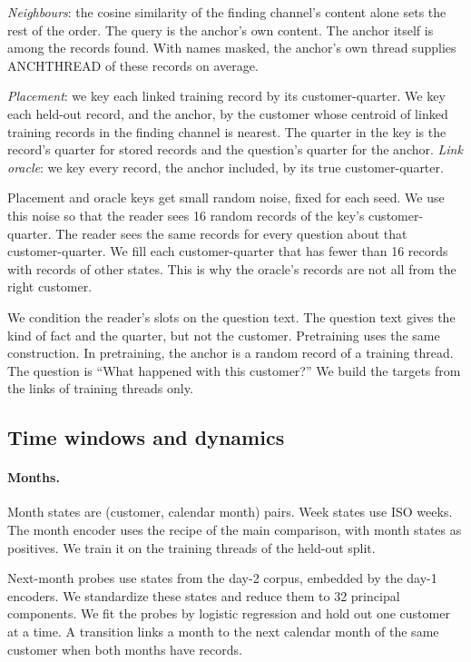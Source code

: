 \documentclass[11pt]{article}
\begin{document}
\emph{Neighbours}: the cosine similarity of the finding channel's content alone sets the rest of the order. The query is the anchor's own content. The anchor itself is among the records found. With names masked, the anchor's own thread supplies ANCHTHREAD of these records on average.

\emph{Placement}: we key each linked training record by its customer-quarter. We key each held-out record, and the anchor, by the customer whose centroid of linked training records in the finding channel is nearest. The quarter in the key is the record's quarter for stored records and the question's quarter for the anchor. \emph{Link oracle}: we key every record, the anchor included, by its true customer-quarter.

Placement and oracle keys get small random noise, fixed for each seed. We use this noise so that the reader sees 16 random records of the key's customer-quarter. The reader sees the same records for every question about that customer-quarter. We fill each customer-quarter that has fewer than 16 records with records of other states. This is why the oracle's records are not all from the right customer.

We condition the reader's slots on the question text. The question text gives the kind of fact and the quarter, but not the customer. Pretraining uses the same construction. In pretraining, the anchor is a random record of a training thread. The question is ``What happened with this customer?'' We build the targets from the links of training threads only.

\subsection{Time windows and dynamics}
\paragraph{Months.} Month states are (customer, calendar month) pairs. Week states use ISO weeks. The month encoder uses the recipe of the main comparison, with month states as positives. We train it on the training threads of the held-out split.

Next-month probes use states from the day-2 corpus, embedded by the day-1 encoders. We standardize these states and reduce them to 32 principal components. We fit the probes by logistic regression and hold out one customer at a time. A transition links a month to the next calendar month of the same customer when both months have records.
\end{document}
